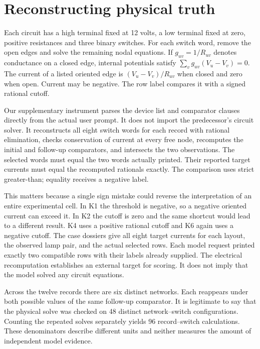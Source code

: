 \documentclass[12pt,letterpaper]{article}
\begin{document}
\clearpage\section{Reconstructing physical truth}

Each circuit has a high terminal fixed at 12 volts, a low terminal fixed at zero, positive resistances and three binary switches. For each switch word, remove the open edges and solve the remaining nodal equations. If $g_{uv}=1/R_{uv}$ denotes conductance on a closed edge, internal potentials satisfy $\sum_v g_{uv}(V_u-V_v)=0$. The current of a listed oriented edge is $(V_u-V_v)/R_{uv}$ when closed and zero when open. Current may be negative. The row label compares it with a signed rational cutoff.

Our supplementary instrument parses the device list and comparator clauses directly from the actual user prompt. It does not import the predecessor's circuit solver. It reconstructs all eight switch words for each record with rational elimination, checks conservation of current at every free node, recomputes the initial and follow-up comparators, and intersects the two observations. The selected words must equal the two words actually printed. Their reported target currents must equal the recomputed rationals exactly. The comparison uses strict greater-than; equality receives a negative label.

This matters because a single sign mistake could reverse the interpretation of an entire experimental cell. In K1 the threshold is negative, so a negative oriented current can exceed it. In K2 the cutoff is zero and the same shortcut would lead to a different result. K4 uses a positive rational cutoff and K6 again uses a negative cutoff. The case dossiers give all eight target currents for each layout, the observed lamp pair, and the actual selected rows. Each model request printed exactly two compatible rows with their labels already supplied. The electrical recomputation establishes an external target for scoring. It does not imply that the model solved any circuit equations.

Across the twelve records there are six distinct networks. Each reappears under both possible values of the same follow-up comparator. It is legitimate to say that the physical solve was checked on 48 distinct network--switch configurations. Counting the repeated solves separately yields 96 record--switch calculations. These denominators describe different units and neither measures the amount of independent model evidence.
\end{document}
